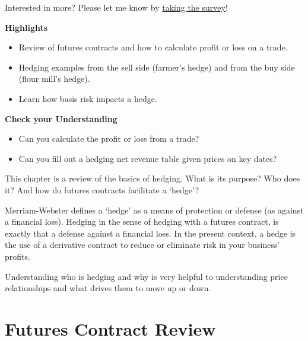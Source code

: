 \documentclass[
  letterpaper,
  DIV=11,
  numbers=noendperiod]{scrreprt}
\providecommand{\tightlist}{%
  \setlength{\itemsep}{0pt}\setlength{\parskip}{0pt}}\usepackage{longtable,booktabs,array}
\begin{document}
{Interested in more? Please let me know by}
\href{https://forms.gle/Q3VByCQZHjfQSy9D7}{taking the survey}!

\textbf{Highlights}

\begin{itemize}
\tightlist
\item
  Review of futures contracts and how to calculate profit or loss on a
  trade.
\item
  Hedging examples from the sell side (farmer's hedge) and from the buy
  side (flour mill's hedge).
\item
  Learn how basis risk impacts a hedge.
\end{itemize}

\textbf{Check your Understanding}

\begin{itemize}
\tightlist
\item
  Can you calculate the profit or loss from a trade?
\item
  Can you fill out a hedging net revenue table given prices on key
  dates?
\end{itemize}

This chapter is a review of the basics of hedging. What is its purpose?
Who does it? And how do futures contracts facilitate a `hedge'?

Merriam-Webster defines a `hedge' as a means of protection or defense
(as against a financial loss). Hedging in the sense of hedging with a
futures contract, is exactly that a defense against a financial loss. In
the present context, a hedge is the use of a derivative contract to
reduce or eliminate risk in your business' profits.

Understanding who is hedging and why is very helpful to understanding
price relationships and what drives them to move up or down.

\section{Futures Contract Review}\label{futures-contract-review}
\end{document}
